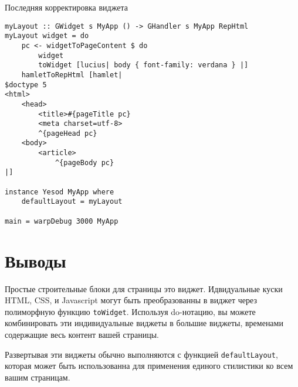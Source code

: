 Последняя корректировка виджета

\begin{lstlisting}
myLayout :: GWidget s MyApp () -> GHandler s MyApp RepHtml
myLayout widget = do
    pc <- widgetToPageContent $ do
        widget
        toWidget [lucius| body { font-family: verdana } |]
    hamletToRepHtml [hamlet|
$doctype 5
<html>
    <head>
        <title>#{pageTitle pc}
        <meta charset=utf-8>
        ^{pageHead pc}
    <body>
        <article>
            ^{pageBody pc}
|]

instance Yesod MyApp where
    defaultLayout = myLayout

main = warpDebug 3000 MyApp
\end{lstlisting}

\section{Выводы}

Простые строительные блоки для страницы это виджет. Идвидуальные куски HTML, CSS, и Javascript могут быть преобразованны в виджет через полиморфную функцию \lstinline'toWidget'. Используя do-нотацию, вы можете комбинировать эти индивидуальные виджеты в большие виджеты, временами содержащие весь контент вашей страницы.

Развертывая эти виджеты обычно выполняются с функцией \lstinline'defaultLayout', которая может быть использованна для применения единого стилистики ко всем вашим страницам.
